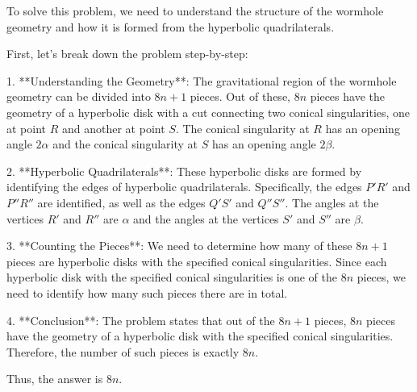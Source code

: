 To solve this problem, we need to understand the structure of the wormhole geometry and how it is formed from the hyperbolic quadrilaterals.

First, let's break down the problem step-by-step:

1. **Understanding the Geometry**: The gravitational region of the wormhole geometry can be divided into \(8n+1\) pieces. Out of these, \(8n\) pieces have the geometry of a hyperbolic disk with a cut connecting two conical singularities, one at point \(R\) and another at point \(S\). The conical singularity at \(R\) has an opening angle \(2\alpha\) and the conical singularity at \(S\) has an opening angle \(2\beta\).

2. **Hyperbolic Quadrilaterals**: These hyperbolic disks are formed by identifying the edges of hyperbolic quadrilaterals. Specifically, the edges \(P'R'\) and \(P''R''\) are identified, as well as the edges \(Q'S'\) and \(Q''S''\). The angles at the vertices \(R'\) and \(R''\) are \(\alpha\) and the angles at the vertices \(S'\) and \(S''\) are \(\beta\).

3. **Counting the Pieces**: We need to determine how many of these \(8n+1\) pieces are hyperbolic disks with the specified conical singularities. Since each hyperbolic disk with the specified conical singularities is one of the \(8n\) pieces, we need to identify how many such pieces there are in total.

4. **Conclusion**: The problem states that out of the \(8n+1\) pieces, \(8n\) pieces have the geometry of a hyperbolic disk with the specified conical singularities. Therefore, the number of such pieces is exactly \(8n\).

Thus, the answer is \(\boxed{8n}\).